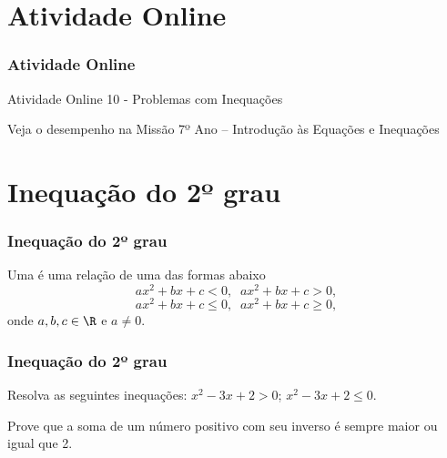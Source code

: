 \documentclass[brazil, notheorems, 10pt]{beamer}
\begin{document}
\section{Atividade Online}
\begin{frame}
\frametitle{Atividade Online} %

{Atividade Online 10 - Problemas com Inequações}


Veja o desempenho na Missão 7º Ano -- Introdução às Equações e
Inequações

\end{frame}
\section{Inequação do 2º grau}
\begin{frame}
\frametitle{Inequação do 2º grau} %

\begin{Def}
Uma  é uma relação de uma das formas
abaixo
$$ax^2 +bx + c <0, \; \; ax^2 +bx + c>0,$$ $$ax^2 +bx + c \leq 0, \; \; ax^2 +bx + c \geq 0,$$ onde
$a, b, c \in \R$ e $ a \neq 0$.
\end{Def}


\end{frame}


\begin{frame}
\frametitle{Inequação do 2º grau} %

\begin{Exem}
Resolva as seguintes inequações: $x^2 -3x +2 > 0$; $x^2 -3x +2 \leq
0$.
\end{Exem}

\begin{Exem}
Prove que a soma de um número positivo com seu inverso é sempre
maior ou igual que 2.
\end{Exem}

\end{frame}
\end{document}
